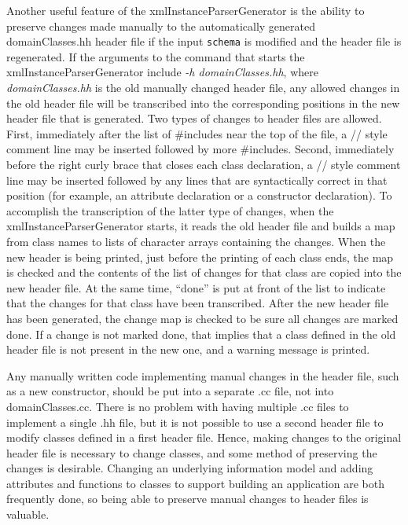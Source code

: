 \documentclass[preprint,12pt]{elsarticle}
\begin{document}
Another useful feature of the xmlInstanceParserGenerator is the ability to
preserve changes made manually to the automatically generated
domainClasses.hh header file if the input {\tt schema} is modified and the
header file is regenerated. If the arguments to the command that starts the
xmlInstanceParserGenerator include {\em -h domainClasses.hh}, where {\em
  domainClasses.hh} is the old manually changed header file, any allowed
changes in the old header file will be transcribed into the corresponding
positions in the new header file that is generated. Two types of changes to
header files are allowed. First, immediately after the list of \#includes
near the top of the file, a // style comment line may be inserted followed
by more \#includes. Second, immediately before the right curly brace that
closes each class declaration, a // style comment line may be inserted
followed by any lines that are syntactically correct in that position (for
example, an attribute declaration or a constructor declaration). To
accomplish the transcription of the latter type of changes, when the
xmlInstanceParserGenerator starts, it reads the old header file and builds
a map from class names to lists of character arrays containing the changes.
When the new header is being printed, just before the printing of each
class ends, the map is checked and the contents of the list of changes for
that class are copied into the new header file. At the same time, ``done'' is
put at front of the list to indicate that the changes for that class have
been transcribed. After the new header file has been generated, the change
map is checked to be sure all changes are marked done. If a change is not
marked done, that implies that a class defined in the old header file is
not present in the new one, and a warning message is printed.

Any manually written code implementing manual changes in the header file,
such as a new constructor, should be put into a separate .cc file, not into
domainClasses.cc. There is no problem with having multiple .cc files to
implement a single .hh file, but it is not possible to use a second header
file to modify classes defined in a first header file. Hence, making
changes to the original header file is necessary to change classes, and
some method of preserving the changes is desirable. Changing an underlying
information model and adding attributes and functions to classes to support
building an application are both frequently done, so being able to preserve
manual changes to header files is valuable.
\end{document}
